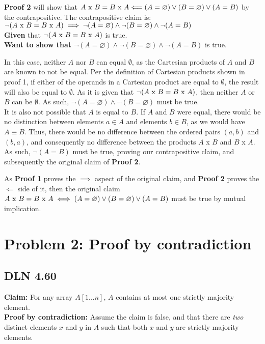 \documentclass[titlepage]{article}
\begin{document}
\textbf{Proof 2} will show that \(A $ x $ B = B $ x $ A \Longleftarrow (A= \varnothing) \lor (B= \varnothing) \lor (A=B)\) by the contrapositive. The contrapositive claim is: \(\lnot (A $ x $ B = B $ x $ A) \implies \lnot(A= \varnothing) \land \lnot (B= \varnothing) \land \lnot (A=B)\)\\
\textbf{Given} that \(\lnot (A $ x $ B = B $ x $ A)\) is true.\\
\textbf{Want to show that} \(\lnot(A= \varnothing) \land \lnot (B= \varnothing) \land \lnot (A=B)\) is true.

In this case, neither $A$ nor $B$ can equal $\emptyset$, as the Cartesian products of $A$ and $B$ are known to not be equal. Per the definition of Cartesian products shown in proof 1, if either of the operands in a Cartesian product are equal to $\emptyset$, the result will also be equal to $\emptyset$. As it is given that \(\lnot (A $ x $ B = B $ x $ A)\), then neither $A$ or $B$ can be $\emptyset$. As such, \(\lnot(A= \varnothing) \land \lnot (B= \varnothing)\) must be true.\\
It is also not possible that $A$ is equal to $B$. If $A$ and $B$ were equal, there would be no distinction between elements $a \in A$ and elements $b \in B$, as we would have $A \equiv B$. Thus, there would be no difference between the ordered pairs $(a,b)$ and $(b,a)$, and consequently no difference between the products $A$ x $B$ and  $B$ x $A$. As such, \(\lnot (A=B)\) must be true, proving our contrapositive claim, and subsequently the original claim of \textbf{Proof 2}.

As \textbf{Proof 1} proves the $\implies$ aspect of the original claim, and \textbf{Proof 2} proves the $\Longleftarrow$ side of it, then the original claim \(A $ x $ B = B $ x $ A \iff (A= \varnothing) \lor (B= \varnothing) \lor (A=B)\) must be true by mutual implication.

\section{Problem 2: Proof by contradiction}

\subsection{DLN 4.60}  %

\textbf{Claim: } For any array $A[1 ... n]$, $A$ contains at most one strictly majority element.\\
\textbf{Proof by contradiction: } Assume the claim is false, and that there are \textit{two} distinct elements $x$ and $y$ in $A$ such that both $x$ and $y$ are strictly majority elements.
\end{document}
